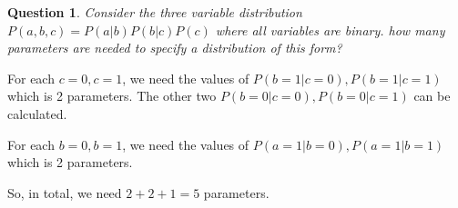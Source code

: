 \documentclass[11pt]{book}
\newtheorem{question}{Question}
\begin{document}
\begin{question}
    Consider the three variable distribution $P(a, b, c) = P(a|b)P(b|c)P(c)$
    where all variables are binary. how many parameters are needed to specify
    a distribution of this form?
\end{question}
For each $c=0, c=1$, we need the values of $P(b=1|c=0), P(b=1|c=1)$ which is
2 parameters. The other two $P(b=0|c=0), P(b=0|c=1)$ can be calculated.


For each $b=0, b=1$, we need the values of $P(a=1|b=0), P(a=1|b=1)$ which is
2 parameters.

So, in total, we need $2+2+1 =5$ parameters.
\end{document}
